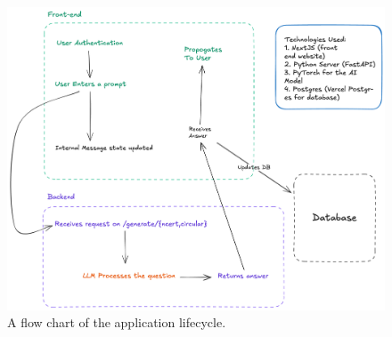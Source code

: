 \documentclass[9pt,a4paper,twocolumn,twoside]{tau-class/tau}
\begin{document}
\begin{figure}[h]
	\centering
	\includegraphics[width=2\linewidth]{./flow-chart.png}
	\caption{A flow chart of the application lifecycle.}
	\label{fig:1}
\end{figure}
\end{document}
